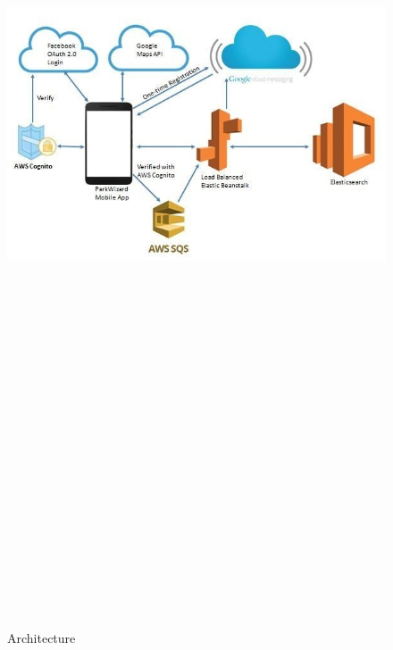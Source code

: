 \documentclass[final]{beamer}
\newlength{\twocolwid}
\begin{document}
\begin{frame}[t]
\begin{columns}[t]
\begin{column}{\twocolwid}
\vspace{1ex}

\begin{figure}
\includegraphics[width=47cm,height=31cm]{architecture_2.JPG}
\caption{Architecture}
\end{figure}


\end{column}
\end{columns}
\end{frame}
\end{document}
